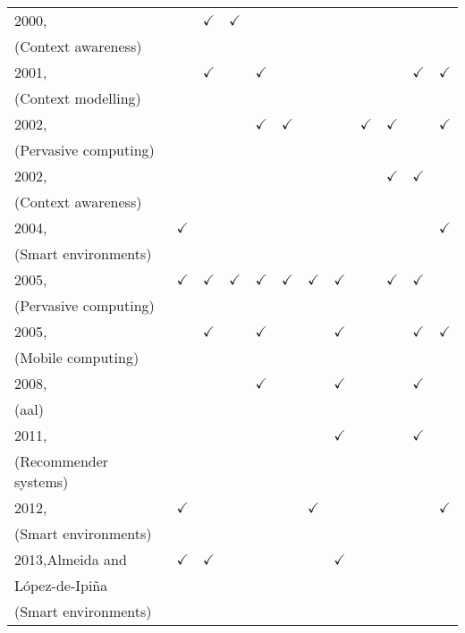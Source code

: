 \begin{table}[H]
\begin{tabular}{l c c c c c c c c c c c }
    2000,~\citet{chen_survey_2000} 		&  & $\checkmark$ & $\checkmark$ &  &  &  &  &  &  &  &  \\
    (Context awareness)\\
    2001,~\citet{jameson_modelling_2001} 	&  & $\checkmark$ &  & $\checkmark$ &  &  &  &  &  & $\checkmark$ & $\checkmark$ \\
    (Context modelling)\\
    2002,~\citet{henricksen_modeling_2002} 	&   &  &  & $\checkmark$ & $\checkmark$ &  &  & $\checkmark$ & $\checkmark$ &  & $\checkmark$ \\
    (Pervasive computing)\\
    2002,~\citet{held_modeling_2002} 		&  &  &  &  &  &  &  &  & $\checkmark$ & $\checkmark$  &  \\
    (Context awareness)\\
    2004,~\citet{gu_toward_2004} 		& $\checkmark$ &  &  &  &  &  &  &  &  &  & $\checkmark$ \\
    (Smart environments)\\
    2005,~\citet{chen_using_2005} 		& $\checkmark$ & $\checkmark$ & $\checkmark$ & $\checkmark$ & $\checkmark$ & $\checkmark$ & $\checkmark$ &  & $\checkmark$ & $\checkmark$ & \\
    (Pervasive computing)\\
    2005,~\citet{yamabe_citron_2005} 		&  & $\checkmark$ &  & $\checkmark$ &  &  & $\checkmark$ &  &  & $\checkmark$ & $\checkmark$ \\
    (Mobile computing)\\
    2008,~\citet{wood_context_aware_2008} 	&  &  &  & $\checkmark$ &  &  & $\checkmark$ &  &  & $\checkmark$ &  \\
    (\ac{aal})\\
    2011,~\citet{baltrunas_incarmusic_2011} 	&  &  &  &  &  &  & $\checkmark$ &  &  & $\checkmark$ &  \\ 
    (Recommender systems)\\
    2012,~\citet{mcavoy_ontology_based_2012} 	& $\checkmark$ &  &  &  &  & $\checkmark$ &  &  &  &  & $\checkmark$  \\
    (Smart environments)\\
    2013,Almeida and	& $\checkmark$ & $\checkmark$ &  &  &  &  & $\checkmark$ &  &  &  &  \\
    López-de-Ipiña~\citep{almeida_assessing_2012}\\
    (Smart environments)\\
\hline

\end{tabular}
\end{table}